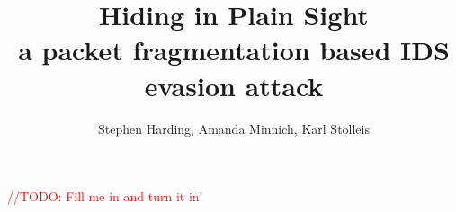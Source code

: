 \documentclass[]{article}
\newcommand{\todo}[1][FIXME!!!]{\textcolor{red}{//TODO: #1}}
\begin{document}
\title{Hiding in Plain Sight\\ \large a packet fragmentation based IDS evasion attack}
\author{Stephen Harding, Amanda Minnich, Karl Stolleis}

\maketitle

\todo[Fill me in and turn it in!]
\end{document}
